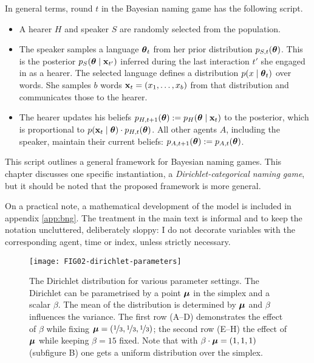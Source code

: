 \documentclass{../src/bcthesispart}
\begin{document}
In general terms, round $t$ in the Bayesian naming game has the following script.
\begin{itemize}
	\item A hearer $H$ and speaker $S$ are randomly selected from the population.	

	\item The speaker samples a language $\boldsymbol{\mathbf{\theta}}_t$ from her prior distribution $p_{S,t}(\boldsymbol{\mathbf{\theta}})$. This is the posterior $p_{S}(\boldsymbol{\mathbf{\theta}} \mid \boldsymbol{\mathbf{x}}_{t'})$ inferred during the last interaction $t'$ she engaged in as a hearer. The selected language defines a distribution $p(x \mid \boldsymbol{\mathbf{\theta}}_t)$ over words. She samples $b$ words $\boldsymbol{\mathbf{x}}_t = (x_1, \dots, x_b)$ from that distribution and communicates those to the hearer.

	\item The hearer updates his beliefs $p_{H, t+1}(\boldsymbol{\mathbf{\theta}}) := p_H(\boldsymbol{\mathbf{\theta}} \mid \boldsymbol{\mathbf{x}}_t)$ to the posterior, which is proportional to $p(\boldsymbol{\mathbf{x}}_t \mid \boldsymbol{\mathbf{\theta}})\cdot p_{H, t}(\boldsymbol{\mathbf{\theta}})$. 
		All other agents $A$, including the speaker, maintain their current beliefs: $p_{A,t+1}(\boldsymbol{\mathbf{\theta}}) := p_{A, t}(\boldsymbol{\mathbf{\theta}})$.
\end{itemize}
This script outlines a general framework for Bayesian naming games.
This chapter discusses one specific instantiation, a \emph{Dirichlet-categorical naming game}, but it should be noted that the proposed framework is more general.



On a practical note, a mathematical development of the model is included in appendix \ref{app:bng}.
The treatment in the main text is informal and to keep the notation uncluttered, deliberately sloppy:
I do not decorate variables with the corresponding agent, time or index, unless strictly necessary.




\begin{SCfigure}
	\texttt{[image: FIG02-dirichlet-parameters]}
	
	\caption{
	The Dirichlet distribution for various parameter settings. 
	The Dirichlet can be parametrised by a point $\boldsymbol{\mathbf{\mu}}$ in the simplex and a scalar $\beta$. 
	The mean of the distribution is determined by $\boldsymbol{\mathbf{\mu}}$ and $\beta$ influences the variance.
	The first row (A--D) demonstrates the effect of $\beta$ while fixing $\boldsymbol{\mathbf{\mu}}=(\nicefrac13, \nicefrac13,\nicefrac13)$; 
	the second row (E--H) the effect of $\boldsymbol{\mathbf{\mu}}$ while keeping $\beta=15$ fixed. 
	Note that with $\beta\cdot\boldsymbol{\mathbf{\mu}} = (1,1,1)$ (subfigure B) one gets a uniform distribution over the simplex.
	\label{fig:dirichlet-parameterisation}}
\end{SCfigure}
\end{document}
